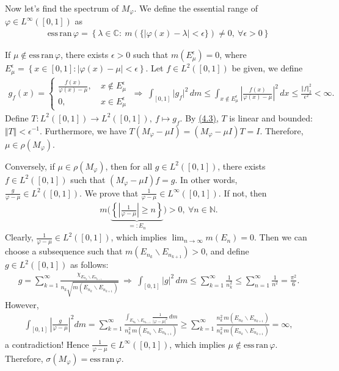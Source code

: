 \documentclass{article}
\begin{document}
Now let's find the spectrum of $M_\varphi$. We define the essential range of $\varphi\in L^\infty([0,1])$ as
\begin{align*}
	\mathrm{ess}\,\mathrm{ran}\,\varphi = \left\{\lambda\in\mathbb{C}:\ m\left(\{\vert \varphi(x)-\lambda\vert <\epsilon\}\right)\neq 0,\ \forall\epsilon>0\right\}
\end{align*}

If $\mu\notin\mathrm{ess}\,\mathrm{ran}\,\varphi$, there exists $\epsilon>0$ such that $m(E_\mu^\epsilon)=0$, where $E_\mu^\epsilon=\left\{x\in[0,1]:\vert \varphi(x)-\mu\vert < \epsilon\right\}$. Let $f\in L^2([0,1])$ be given, we define
\begin{align*}
	g_f(x)=\begin{cases}
		\frac{f(x)}{\varphi(x)-\mu},\ & x\notin E_\mu^\epsilon\\
		0,\ & x\in E_\mu^\epsilon
	\end{cases}\ \Rightarrow\ \int_{[0,1]} \vert g_f\vert^2\,dm\leq\int_{x\notin E_\mu^\epsilon} \left\vert \frac{f(x)}{\varphi(x)-\mu}\right\vert^2\,dx \leq\frac{\Vert f\Vert^2_2}{\epsilon^2} < \infty.\tag{4.3}\label{eq:4.3}
\end{align*}
Define $T:L^2([0,1])\to L^2([0,1]),\ f\mapsto g_f$. By \hyperref[eq:4.3]{(4.3)}, $T$ is linear and bounded: $\Vert T\Vert < \epsilon^{-1}$. Furthermore, we have $T(M_\varphi - \mu I) = (M_\varphi - \mu I) T = I$. Therefore, $\mu\in\rho(M_\varphi)$.\vspace{0.1cm}

Conversely, if $\mu\in\rho(M_\varphi)$, then for all $g\in L^2([0,1])$, there exists $f\in L^2([0,1])$ such that $(M_\varphi-\mu I) f = g$. In other words, $\frac{g}{\varphi-\mu}\in L^2([0,1])$. We prove that $\frac{1}{\varphi - \mu}\in L^\infty([0,1])$. If not, then
\begin{align*}
	m\biggl(\underbrace{\left\{\left\vert\frac{1}{\varphi-\mu}\right\vert\geq n\right\}}_{=:E_n}\biggr) >0,\ \forall n\in\mathbb{N}.
\end{align*}
Clearly, $\frac{1}{\varphi-\mu}\in L^2([0,1])$, which implies $\lim_{n\to\infty}m(E_n)=0$. Then we can choose a subsequence such that $m(E_{n_k}\backslash E_{n_{k+1}})>0$, and define $g\in L^2([0,1])$ as follows:
\begin{align*}
	g = \sum_{k=1}^\infty\frac{\chi_{E_{n_k}\backslash E_{n_{k+1}}}}{n_k\sqrt{m(E_{n_k}\backslash E_{n_{k+1}})}}\ \Rightarrow\ \int_{[0,1]}\vert g\vert^2\,dm \leq \sum_{k=1}^\infty \frac{1}{n_k^2}\leq\sum_{n=1}^\infty\frac{1}{n^2} =\frac{\pi^2}{6}.
\end{align*}
However,
\begin{align*}
	\int_{[0,1]}\left\vert\frac{g}{\varphi-\mu}\right\vert^2 dm =\sum_{k=1}^\infty \frac{\int_{E_{n_k}\backslash E_{n_{k+1}}}\frac{1}{\vert\varphi-\mu\vert^2}\,dm}{n_k^2\, m(E_{n_k}\backslash E_{n_{k+1}})} \geq \sum_{k=1}^\infty \frac{n_k^2\, m(E_{n_k}\backslash E_{n_{k+1}})}{n_k^2\, m(E_{n_k}\backslash E_{n_{k+1}})} = \infty,
\end{align*}
a contradiction! Hence $\frac{1}{\varphi-\mu}\in L^\infty([0,1])$, which implies $\mu\notin\mathrm{ess}\,\mathrm{ran}\,\varphi$. Therefore, $\sigma(M_\varphi)=\mathrm{ess}\,\mathrm{ran}\,\varphi$.\vspace{0.1cm}
\end{document}
